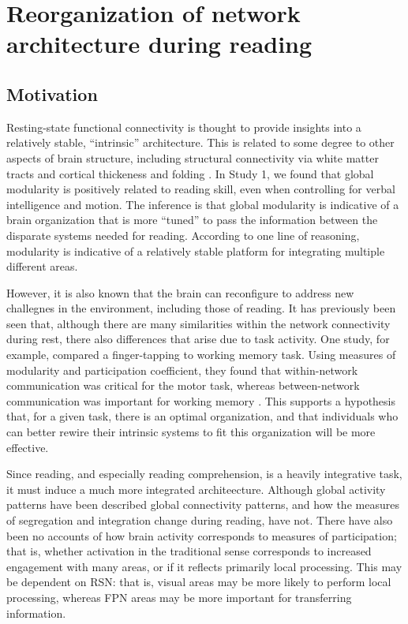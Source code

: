\chapter{Reorganization of network architecture during reading}

\section{Motivation}

Resting-state functional connectivity is thought to provide insights into a relatively stable, ``intrinsic'' architecture. This is related to some degree to other aspects of brain structure, including structural connectivity via white matter tracts and cortical thickeness and folding \citep{Sui2014}. In Study 1, we found that global modularity is positively related to reading skill, even when controlling for verbal intelligence and motion. The inference is that global modularity is indicative of a brain organization that is more ``tuned'' to pass the information between the disparate systems needed for reading. According to one line of reasoning, modularity is indicative of a relatively stable platform for integrating multiple different areas. 

However, it is also known that the brain can reconfigure to address new challegnes in the environment, including those of reading. It has previously been seen that, although there are many similarities within the network connectivity during rest, there also differences that arise due to task activity. One study, for example, compared a finger-tapping to working memory task. Using measures of modularity and participation coefficient, they found that within-network communication was critical for the motor task, whereas between-network communication was important for working memory \citep{Cohen2016}. This supports a hypothesis that, for a given task, there is an optimal organization, and that individuals who can better rewire their intrinsic systems to fit this organization will be more effective. 

Since reading, and especially reading comprehension, is a heavily integrative task, it must induce a much more integrated architeecture. Although global activity patterns have been described \citep{Rimrodt2009, Xu2006} global connectivity patterns, and how the measures of segregation and integration change during reading, have not. There have also been no accounts of how brain activity corresponds to measures of participation; that is, whether activation in the traditional sense corresponds to increased engagement with many areas, or if it reflects primarily local processing. This may be dependent on RSN: that is, visual areas may be more likely to perform local processing, whereas FPN areas may be more important for transferring information. 

